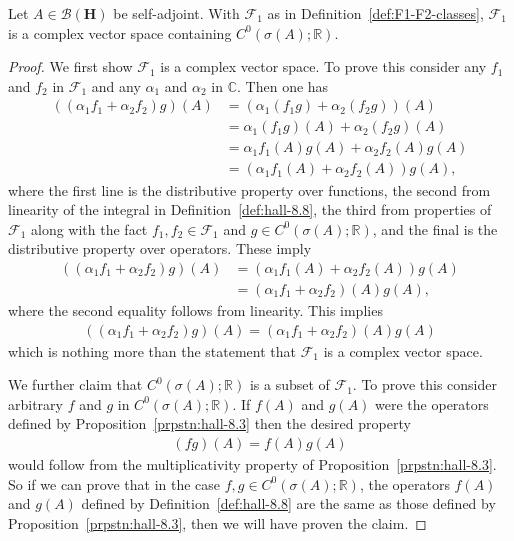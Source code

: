 \begin{proposition}
    \label{prpstn:F1-vector-space}
    \leanok
    Let $A \in \mathcal{B}(\mathbf{H})$ be self-adjoint. With $\mathcal{F}_1$ as in Definition~\ref{def:F1-F2-classes}, $\mathcal{F}_1$ is a complex vector space containing $C^0(\sigma(A); \mathbb{R})$.
\end{proposition}
\begin{proof}
    \leanok
We first show $\mathcal{F}_1$ is a complex vector space. To prove this consider any $f_1$ and $f_2$ in $\mathcal{F}_1$ and any $\alpha_1$ and $\alpha_2$ in $\mathbb{C}$. Then one has
\begin{align}
    ((\alpha_1f_1 + \alpha_2f_2)g)(A) &= (\alpha_1(f_1g) + \alpha_2(f_2g))(A) \\
                                      &= \alpha_1(f_1g)(A) + \alpha_2(f_2g)(A) \\
                                      &= \alpha_1f_1(A)g(A) + \alpha_2f_2(A)g(A) \\
                                      &= (\alpha_1f_1(A) + \alpha_2f_2(A))g(A),
\end{align}
where the first line is the distributive property over functions, the second from linearity of the integral in Definition~\ref{def:hall-8.8}, the third from properties of $\mathcal{F}_1$ along with the fact $f_1, f_2 \in \mathcal{F}_1$ and $g \in C^0(\sigma(A); \mathbb{R})$, and the final is the distributive property over operators. These imply
\begin{align}
    ((\alpha_1f_1 + \alpha_2f_2)g)(A) &= (\alpha_1f_1(A) + \alpha_2f_2(A))g(A) \\
                                      &= (\alpha_1f_1 + \alpha_2f_2)(A)g(A),
\end{align}
where the second equality follows from linearity. This implies
\begin{align}
    ((\alpha_1f_1 + \alpha_2f_2)g)(A) = (\alpha_1f_1 + \alpha_2f_2)(A)g(A)
\end{align}
which is nothing more than the statement that $\mathcal{F}_1$ is a complex vector space.

We further claim that $C^0(\sigma(A); \mathbb{R})$ is a subset of $\mathcal{F}_1$. To prove this consider arbitrary $f$ and $g$ in $C^0(\sigma(A); \mathbb{R})$. If $f(A)$ and $g(A)$ were the operators defined by Proposition~\ref{prpstn:hall-8.3} then the desired property
\begin{align}
    (fg)(A) = f(A)g(A)
\end{align}
would follow from the multiplicativity property of Proposition~\ref{prpstn:hall-8.3}. So if we can prove that in the case $f,g \in C^0(\sigma(A); \mathbb{R})$, the operators $f(A)$ and $g(A)$ defined by Definition~\ref{def:hall-8.8} are the same as those defined by Proposition~\ref{prpstn:hall-8.3}, then we will have proven the claim.


\end{proof}

